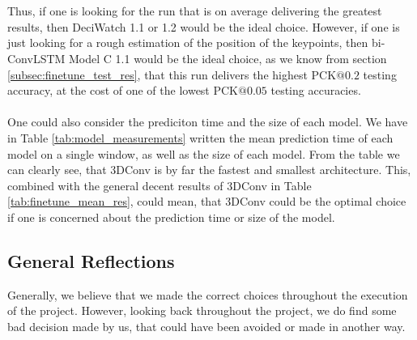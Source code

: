 \documentclass[./main.tex]{subfiles}
\begin{document}
\\
\\
Thus, if one is looking for the run that is on average delivering the greatest results, then DeciWatch 1.1 or 1.2 would be the ideal choice. However, if one is just looking for a rough estimation of the position of the keypoints, then bi-ConvLSTM Model C 1.1 would be the ideal choice, as we know from section \ref{subsec:finetune_test_res}, that this run delivers the highest PCK$@0.2$ testing accuracy, at the cost of one of the lowest PCK$@0.05$ testing accuracies.
\\
\\
One could also consider the prediciton time and the size of each model. We have in Table \ref{tab:model_measurements} written the mean prediction time of each model on a single window, as well as the size of each model. From the table we can clearly see, that 3DConv is by far the fastest and smallest architecture. This, combined with the general decent results of 3DConv in Table \ref{tab:finetune_mean_res}, could mean, that 3DConv could be the optimal choice if one is concerned about the prediction time or size of the model.


\subsection{General Reflections}
\label{sec:general_reflections}
Generally, we believe that we made the correct choices throughout the execution of the project. However, looking back throughout the project, we do find some bad decision made by us, that could have been avoided or made in another way.
\end{document}
